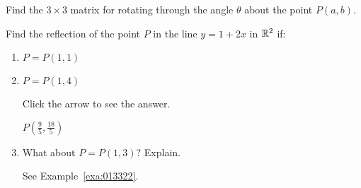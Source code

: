 \documentclass{ximera}
\begin{document}
\begin{problem}\label{prob:app0040_4}
Find the $3 \times 3$ matrix for rotating through the angle $\theta$ about the point $P(a, b)$.
\end{problem}

\begin{problem}\label{prob:app0040_5}
Find the reflection of the point $P$ in the line $y = 1 + 2x$ in $\mathbb{R}^2$ if:


\begin{enumerate} 
\item $P = P(1, 1)$

\item $P = P(1, 4)$

Click the arrow to see the answer.
\begin{expandable}
$P(\frac{9}{5}, \frac{18}{5})$
\end{expandable}

\item What about $P = P(1, 3)$? Explain.
\begin{hint}
    See Example~\ref{exa:013322}.
\end{hint}
\end{enumerate}
\end{problem}
\end{document}
